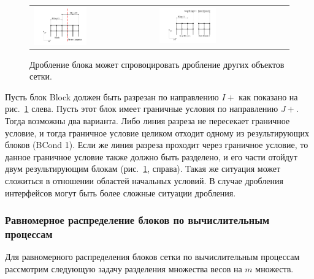 \begin{figure}[ht]
\centering
\begin{tabular}{ll}
\includegraphics[width=0.45\textwidth]{./pics/text_2_withcut/cut-bcond.pdf}
&
\includegraphics[width=0.45\textwidth]{./pics/text_2_withcut/cut-bcond2.pdf}
\end{tabular}
\singlespacing
{}\caption{Дробление блока может спровоцировать дробление других объектов сетки.}
\label{fig:text_2_withcut_cut_bcond}
\end{figure}

Пусть блок Block должен быть разрезан по направлению $I+$ как показано на рис.~\ref{fig:text_2_withcut_cut_bcond} слева.
Пусть этот блок имеет граничные условия по направлению $J+$.
Тогда возможны два варианта.
Либо линия разреза не пересекает граничное условие, и тогда граничное условие целиком отходит одному из результирующих блоков (BCond 1).
Если же линия разреза проходит через граничное условие, то данное граничное условие также должно быть разделено, и его части отойдут двум результирующим блокам (рис.~\ref{fig:text_2_withcut_cut_bcond}, справа). Такая же ситуация может сложиться в отношении областей начальных условий.
В случае дробления интерфейсов могут быть более сложные ситуации дробления.

\subsubsection{Равномерное распределение блоков по вычислительным \\ процессам}

Для равномерного распределения блоков сетки по вычислительным процессам рассмотрим следующую задачу разделения множества весов на $m$ множеств.

